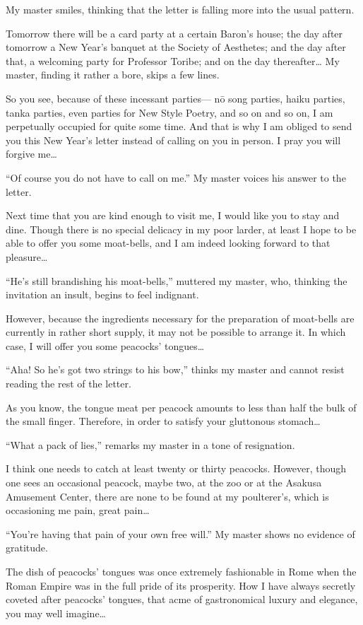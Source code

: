 \documentclass{book}
\begin{document}
My master smiles, thinking that the letter is falling more into the
usual pattern.

Tomorrow there will be a card party at a certain Baron's house; the day
after tomorrow a New Year's banquet at the Society of Aesthetes; and the
day after that, a welcoming party for Professor Toribe; and on the day
thereafter\ldots{} My master, finding it rather a bore, skips a few
lines.

So you see, because of these incessant parties--- nō song parties, haiku
parties, tanka parties, even parties for New Style Poetry, and so on and
so on, I am perpetually occupied for quite some time. And that is why I
am obliged to send you this New Year's letter instead of calling on you
in person. I pray you will forgive me\ldots{}

``Of course you do not have to call on me.'' My master voices his answer
to the letter.

Next time that you are kind enough to visit me, I would like you to stay
and dine. Though there is no special delicacy in my poor larder, at
least I hope to be able to offer you some moat-bells, and I am indeed
looking forward to that pleasure\ldots{}

``He's still brandishing his moat-bells,'' muttered my master, who,
thinking the invitation an insult, begins to feel indignant.

However, because the ingredients necessary for the preparation of
moat-bells are currently in rather short supply, it may not be possible
to arrange it. In which case, I will offer you some peacocks'
tongues\ldots{}

``Aha! So he's got two strings to his bow,'' thinks my master and cannot
resist reading the rest of the letter.

As you know, the tongue meat per peacock amounts to less than half the
bulk of the small finger. Therefore, in order to satisfy your gluttonous
stomach\ldots{}

``What a pack of lies,'' remarks my master in a tone of resignation.

I think one needs to catch at least twenty or thirty peacocks. However,
though one sees an occasional peacock, maybe two, at the zoo or at the
Asakusa Amusement Center, there are none to be found at my poulterer's,
which is occasioning me pain, great pain\ldots{}

``You're having that pain of your own free will.'' My master shows no
evidence of gratitude.

The dish of peacocks' tongues was once extremely fashionable in Rome
when the Roman Empire was in the full pride of its prosperity. How I
have always secretly coveted after peacocks' tongues, that acme of
gastronomical luxury and elegance, you may well imagine\ldots{}
\end{document}
